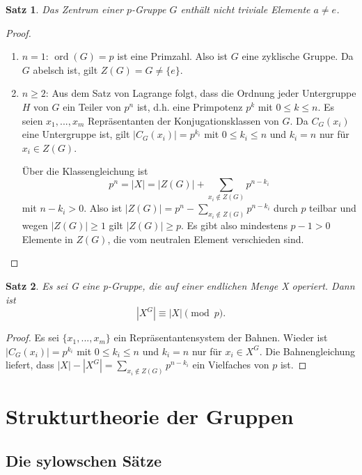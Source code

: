 \documentclass[12pt]{scrartcl} %
\DeclareMathOperator{\ord}{ord}
\newtheorem{thm}{Satz}
\theoremstyle{definition}
\theoremstyle{remark}
\begin{document}
\begin{thm}
	Das Zentrum einer \(p\)-Gruppe \(G\) enthält nicht triviale Elemente $a \neq e$.
\end{thm}

\begin{proof}
	\begin{enumerate}
	\item \(n=1\): \(\ord(G)=p\) ist eine Primzahl.
		Also ist \(G\) eine zyklische Gruppe.
		Da \(G\) abelsch ist, gilt \(Z(G) = G \neq \{e\}\).
	\item \(n\geq 2\): Aus dem Satz von Lagrange folgt, dass die Ordnung jeder Untergruppe $H$ von $G$ ein Teiler von $p^n$ ist, d.h. eine Primpotenz $p^k$ mit $0\leq k\leq n$.
		Es seien $x_{1},...,x_{m}$ Repräsentanten der Konjugationsklassen von $G$.
		Da $C_{G}(x_{i})$ eine Untergruppe ist, gilt \(|C_{G}(x_{i})|=p^{k_i}\) mit $0\leq k_{i} \leq n$ und $k_{i}=n$ nur für $x_i \in Z(G)$.

		Über die Klassengleichung ist \[p^n=|X|=|Z(G)|+\sum_{x_{i}\notin Z(G)}p^{n-k_{i}}\] mit $n-k_{i}>0$.
		Also ist $|Z(G)|= p^n-\sum_{x_{i}\notin Z(G)}p^{n-k_{i}}$ durch \(p\) teilbar und wegen $|Z(G)|\geq 1$ gilt $|Z(G)|\geq p$.
		Es gibt also mindestens $p-1 > 0$ Elemente in $Z(G)$, die vom neutralen Element verschieden sind.\qedhere
\end{enumerate}
\end{proof}

\begin{thm}
	Es sei G eine p-Gruppe, die auf einer endlichen Menge X operiert. Dann ist
	\begin{equation*}
		|X^G|\equiv |X| \pmod{p}.
	\end{equation*}
\end{thm}

\begin{proof}
	Es sei $\{x_{1},...,x_{m}\}$ ein Repräsentantensystem der Bahnen.
	Wieder ist $|C_{G}(x_{i})|=p^{k_i}$ mit $0\leq k_{i} \leq n$ und $k_{i}=n$ nur für $x_{i} \in X^G$.
	Die Bahnengleichung liefert, dass $|X|-|X^G|=\sum_{x_{i}\notin Z(G)}p^{n-k_{i}}$ ein Vielfaches von \(p\) ist.
\end{proof}

\section{Strukturtheorie der Gruppen}

\subsection{Die sylowschen Sätze}
\end{document}
